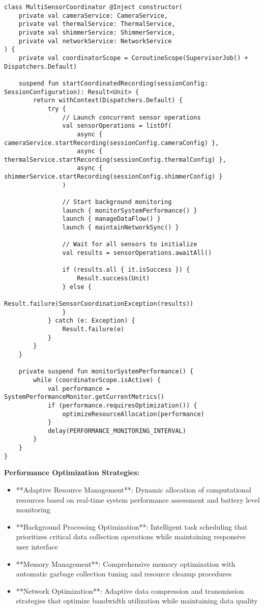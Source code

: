 \documentclass[12pt,a4paper]{article}
\begin{document}
\begin{verbatim}
class MultiSensorCoordinator @Inject constructor(
    private val cameraService: CameraService,
    private val thermalService: ThermalService,
    private val shimmerService: ShimmerService,
    private val networkService: NetworkService
) {
    private val coordinatorScope = CoroutineScope(SupervisorJob() + Dispatchers.Default)
    
    suspend fun startCoordinatedRecording(sessionConfig: SessionConfiguration): Result<Unit> {
        return withContext(Dispatchers.Default) {
            try {
                // Launch concurrent sensor operations
                val sensorOperations = listOf(
                    async { cameraService.startRecording(sessionConfig.cameraConfig) },
                    async { thermalService.startRecording(sessionConfig.thermalConfig) },
                    async { shimmerService.startRecording(sessionConfig.shimmerConfig) }
                )
                
                // Start background monitoring
                launch { monitorSystemPerformance() }
                launch { manageDataFlow() }
                launch { maintainNetworkSync() }
                
                // Wait for all sensors to initialize
                val results = sensorOperations.awaitAll()
                
                if (results.all { it.isSuccess }) {
                    Result.success(Unit)
                } else {
                    Result.failure(SensorCoordinationException(results))
                }
            } catch (e: Exception) {
                Result.failure(e)
            }
        }
    }
    
    private suspend fun monitorSystemPerformance() {
        while (coordinatorScope.isActive) {
            val performance = SystemPerformanceMonitor.getCurrentMetrics()
            if (performance.requiresOptimization()) {
                optimizeResourceAllocation(performance)
            }
            delay(PERFORMANCE_MONITORING_INTERVAL)
        }
    }
}
\end{verbatim}

\textbf{Performance Optimization Strategies:}

\begin{itemize}
\item **Adaptive Resource Management**: Dynamic allocation of computational resources based on real-time system performance
  assessment and battery level monitoring
\item **Background Processing Optimization**: Intelligent task scheduling that prioritizes critical data collection
  operations while maintaining responsive user interface
\item **Memory Management**: Comprehensive memory optimization with automatic garbage collection tuning and resource cleanup
  procedures
\item **Network Optimization**: Adaptive data compression and transmission strategies that optimize bandwidth utilization
  while maintaining data quality

\end{itemize}
\end{document}
